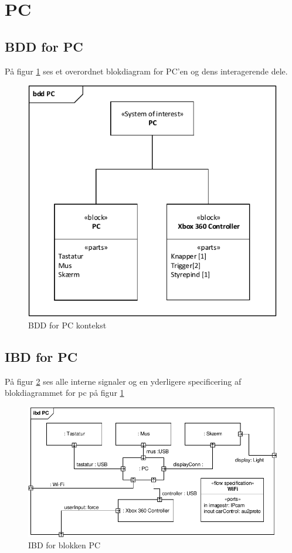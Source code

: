\section{PC}

\subsection{BDD for PC}

På figur \ref{fig:bdd_pc} ses et overordnet blokdiagram for PC'en og dens interagerende dele. 

\begin{figure}[h]
\centering
\includegraphics[width=\textwidth * 3/4]{../fig/diagrammer/pc/bdd_pc.pdf}
\caption{BDD for PC kontekst}
\label{fig:bdd_pc}
\end{figure}

\clearpage
\subsection{IBD for PC}

På figur \ref{fig:ibd_pc} ses alle interne signaler og en yderligere specificering af blokdiagrammet for pc på figur \ref{fig:bdd_pc}

\begin{figure}[h]
\centering
\includegraphics[width=\textwidth]{../fig/diagrammer/pc/ibd_pc.pdf}
\caption{IBD for blokken PC}
\label{fig:ibd_pc}
\end{figure}
\clearpage

